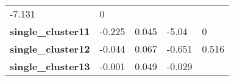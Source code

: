 \documentclass[]{article}
\begin{document}
\begin{longtable}[c]{@{}lllll@{}}
\begin{minipage}[t]{0.12\columnwidth}
-7.131
\strut\end{minipage} &
\begin{minipage}[t]{0.12\columnwidth}\raggedright\strut
0
\strut\end{minipage}\tabularnewline
\begin{minipage}[t]{0.31\columnwidth}\raggedright\strut
\textbf{single\_cluster11}
\strut\end{minipage} &
\begin{minipage}[t]{0.13\columnwidth}\raggedright\strut
-0.225
\strut\end{minipage} &
\begin{minipage}[t]{0.16\columnwidth}\raggedright\strut
0.045
\strut\end{minipage} &
\begin{minipage}[t]{0.12\columnwidth}\raggedright\strut
-5.04
\strut\end{minipage} &
\begin{minipage}[t]{0.12\columnwidth}\raggedright\strut
0
\strut\end{minipage}\tabularnewline
\begin{minipage}[t]{0.31\columnwidth}\raggedright\strut
\textbf{single\_cluster12}
\strut\end{minipage} &
\begin{minipage}[t]{0.13\columnwidth}\raggedright\strut
-0.044
\strut\end{minipage} &
\begin{minipage}[t]{0.16\columnwidth}\raggedright\strut
0.067
\strut\end{minipage} &
\begin{minipage}[t]{0.12\columnwidth}\raggedright\strut
-0.651
\strut\end{minipage} &
\begin{minipage}[t]{0.12\columnwidth}\raggedright\strut
0.516
\strut\end{minipage}\tabularnewline
\begin{minipage}[t]{0.31\columnwidth}\raggedright\strut
\textbf{single\_cluster13}
\strut\end{minipage} &
\begin{minipage}[t]{0.13\columnwidth}\raggedright\strut
-0.001
\strut\end{minipage} &
\begin{minipage}[t]{0.16\columnwidth}\raggedright\strut
0.049
\strut\end{minipage} &
\begin{minipage}[t]{0.12\columnwidth}\raggedright\strut
-0.029
\strut\end{minipage} &

\end{longtable}
\end{document}
